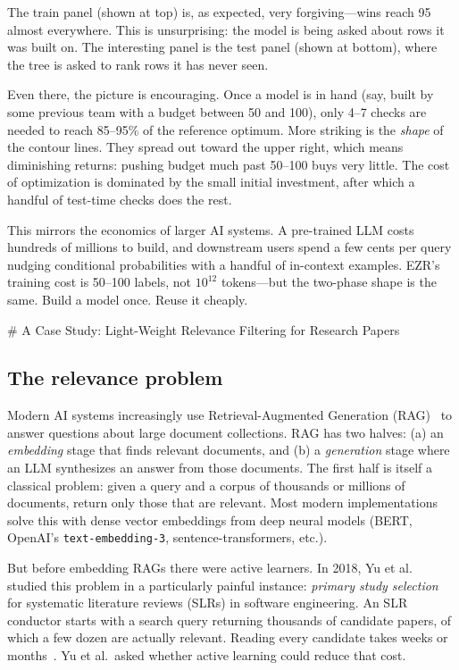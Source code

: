 \documentclass[AMA,STIX2COL]{WileyNJDv5}
\begin{document}
{The train panel (shown at top) is, as expected, very forgiving---wins reach 95
almost everywhere. This is unsurprising: the model is being asked
about rows it was built on. The interesting panel is the test panel (shown at bottom),
where the tree is asked to rank rows it has never seen.

Even there, the picture is encouraging. Once a model is in hand
(say, built by some previous team with a  \textsf{budget} between 50 and 100), only 4--7 checks are
needed to reach 85--95\% of the reference optimum. More striking
is the {\em shape} of the contour lines. They spread out toward
the upper right, which means diminishing returns: pushing
\textsf{budget} much past 50--100 buys very little. The cost of
optimization is dominated by the small initial investment, after
which a handful of test-time checks does the rest.

This mirrors the economics of larger AI systems. A pre-trained
LLM costs hundreds of millions to build, and downstream users
spend a few cents per query nudging conditional probabilities with
a handful of in-context examples. EZR's training cost is 50--100
labels, not $10^{12}$ tokens---but the two-phase shape is the same.
Build a model once. Reuse it cheaply.


# A Case Study: Light-Weight Relevance Filtering for Research Papers

\subsection*{The relevance problem}

Modern AI systems increasingly use Retrieval-Augmented
Generation (RAG)~\cite{lewis2020retrieval} to answer questions
about large document collections. RAG has two halves: (a) an
{\em embedding} stage that finds relevant documents, and (b) a
{\em generation} stage where an LLM synthesizes an answer from
those documents. The first half is itself a classical problem:
given a query and a corpus of thousands or millions of
documents, return only those that are relevant. Most modern
implementations solve this with dense vector embeddings from
deep neural models (BERT, OpenAI's \texttt{text-embedding-3},
sentence-transformers, etc.).

But before embedding RAGs there were active learners. In 2018,
Yu et al.~\cite{yu2018finding} studied this problem in a
particularly painful instance: {\em primary study selection}
for systematic literature reviews (SLRs) in software
engineering. An SLR conductor starts with a search query
returning thousands of candidate papers, of which a few dozen
are actually relevant. Reading every candidate takes weeks
or months~\cite{kitchenham2010,carver2013}. Yu et al.\ asked
whether active learning could reduce that cost.

}
\end{document}
